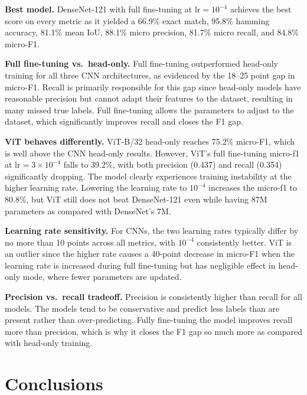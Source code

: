 \documentclass[10pt]{article}
\begin{document}
\textbf{Best model.}
DenseNet-121 with full fine-tuning at $\text{lr}=10^{-4}$ achieves the best score
on every metric as it yielded a 66.9\% exact match, 95.8\% hamming accuracy, 81.1\% mean IoU,
88.1\% micro precision, 81.7\% micro recall, and 84.8\% micro-F1.

\textbf{Full fine-tuning vs.\ head-only.}
Full fine-tuning outperformed head-only training for all three CNN architectures, 
as evidenced by the 18--25 point gap in micro-F1. Recall is primarily responsible for
this gap since head-only models have reasonable precision but cannot adapt their features
to the dataset, resulting in many missed true labels. Full fine-tuning allows the parameters
to adjust to the dataset, which significantly improves recall and closes the F1 gap.

\textbf{ViT behaves differently.}
ViT-B/32 head-only reaches 75.2\% micro-F1, which is well above the CNN head-only
results. However, ViT's full fine-tuning micro-f1 at $\text{lr}=3\times10^{-4}$ falls to
39.2\%, with both precision (0.437) and recall (0.354) significantly dropping.
The model clearly experiences training instability at the higher learning rate.
Lowering the learning rate to $10^{-4}$ increases the micro-f1 to 80.8\%, but ViT still does not
beat DenseNet-121 even while having 87M parameters as compared with DenseNet's 7M.

\textbf{Learning rate sensitivity.}
For CNNs, the two learning rates typically differ by no more than 10 points across all metrics,
with $10^{-4}$ consistently better. ViT is an outlier since the higher rate causes a
40-point decrease in micro-F1 when the learning rate is increased during full fine-tuning but has negligible effect
in head-only mode, where fewer parameters are updated.

\textbf{Precision vs.\ recall tradeoff.}
Precision is consistently higher than recall for all models. The models
tend to be conservative and predict less labels than are present rather than
over-predicting. Fully fine-tuning the model improves recall more than precision,
which is why it closes the F1 gap so much more as compared with head-only training.

\section{Conclusions}
\end{document}
